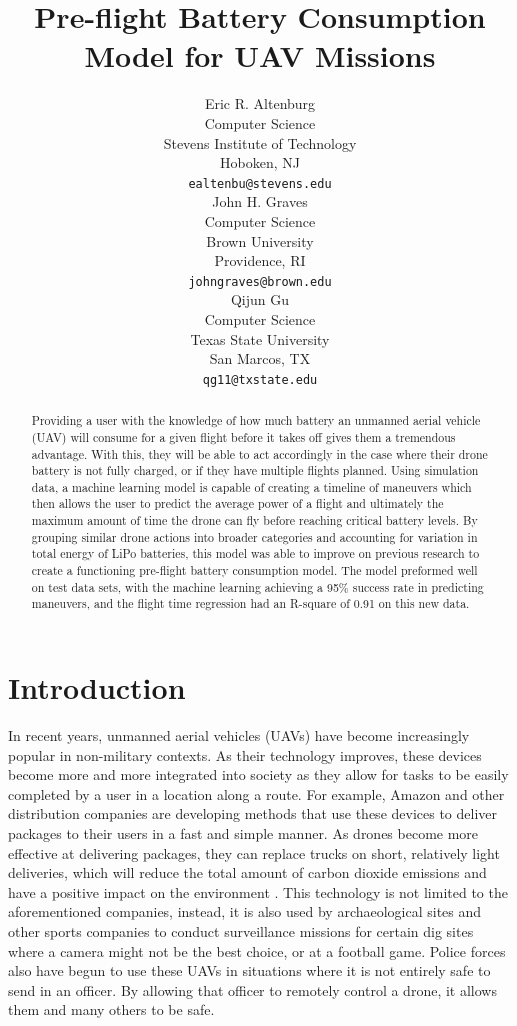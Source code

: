 \documentclass{article}
\title{Pre-flight Battery Consumption Model for UAV Missions}
\author{
Eric R. Altenburg\\
Computer Science\\
Stevens Institute of Technology\\
Hoboken, NJ \\
\texttt{ealtenbu@stevens.edu}\\
\And
John H. Graves\\
Computer Science\\
Brown University\\
Providence, RI \\
\texttt{john\textunderscore graves@brown.edu} \\
\And
Qijun Gu\\
Computer Science\\
Texas State University\\
San Marcos, TX \\
\texttt{qg11@txstate.edu}\\
}
\begin{document}
\maketitle


\begin{abstract}
Providing a user with the knowledge of how much battery an unmanned aerial vehicle (UAV) will consume for a given flight before it takes off gives them a tremendous advantage. With this, they will be able to act accordingly in the case where their drone battery is not fully charged, or if they have multiple flights planned. Using simulation data, a machine learning model is capable of creating a timeline of maneuvers which then allows the user to predict the average power of a flight and ultimately the maximum amount of time the drone can fly before reaching critical battery levels. By grouping similar drone actions into broader categories and accounting for variation in total energy of LiPo batteries, this model was able to improve on previous research to create a functioning pre-flight battery consumption model. The model preformed well on test data sets, with the machine learning achieving a 95\% success rate in predicting maneuvers, and the flight time regression had an R-square of 0.91 on this new data.
\end{abstract}




\section{Introduction}

In recent years, unmanned aerial vehicles (UAVs) have become increasingly popular in non-military contexts. As their technology improves, these devices become more and more integrated into society as they allow for tasks to be easily completed by a user in a location along a route. For example, Amazon and other distribution companies are developing methods that use these devices to deliver packages to their users in a fast and simple manner. As drones become more effective at delivering packages, they can replace trucks on short, relatively light deliveries, which will reduce the total amount of carbon dioxide emissions and have a positive impact on the environment \cite{Goodchild}. This technology is not limited to the aforementioned companies, instead, it is also used by archaeological sites and other sports companies to conduct surveillance missions for certain dig sites where a camera might not be the best choice, or at a football game. Police forces also have begun to use these UAVs in situations where it is not entirely safe to send in an officer. By allowing that officer to remotely control a drone, it allows them and many others to be safe.\par
\end{document}
